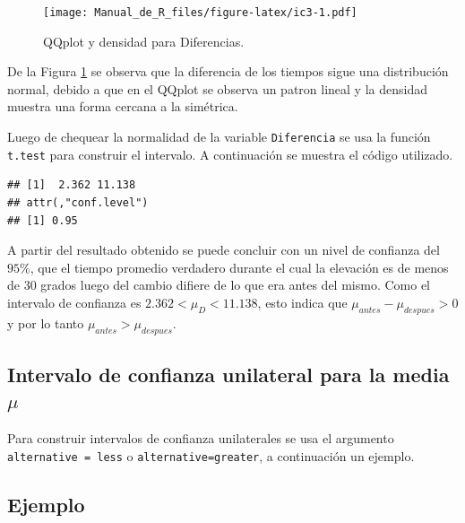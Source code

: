 \documentclass[10pt,]{krantz}
\makeatletter
\newenvironment{Shaded}{\begin{snugshade}}{\end{snugshade}}
\newcommand{\KeywordTok}[1]{\textcolor[rgb]{0.13,0.29,0.53}{\textbf{#1}}}
\newcommand{\DataTypeTok}[1]{\textcolor[rgb]{0.13,0.29,0.53}{#1}}
\newcommand{\FloatTok}[1]{\textcolor[rgb]{0.00,0.00,0.81}{#1}}
\newcommand{\OtherTok}[1]{\textcolor[rgb]{0.56,0.35,0.01}{#1}}
\newcommand{\OperatorTok}[1]{\textcolor[rgb]{0.81,0.36,0.00}{\textbf{#1}}}
\newcommand{\NormalTok}[1]{#1}
\newenvironment{kframe}{%
\medskip{}
\setlength{\fboxsep}{.8em}
 \def\at@end@of@kframe{}%
 \ifinner\ifhmode%
  \def\at@end@of@kframe{\end{minipage}}%
  \begin{minipage}{\columnwidth}%
 \fi\fi%
 \def\FrameCommand##1{\hskip\@totalleftmargin \hskip-\fboxsep
 \colorbox{shadecolor}{##1}\hskip-\fboxsep
     \hskip-\linewidth \hskip-\@totalleftmargin \hskip\columnwidth}%
 \MakeFramed {\advance\hsize-\width
   \@totalleftmargin\z@ \linewidth\hsize
   \@setminipage}}%
 {\par\unskip\endMakeFramed%
 \at@end@of@kframe}
\renewenvironment{Shaded}{\begin{kframe}}{\end{kframe}}
\makeatother
\begin{document}
\begin{figure}
\centering
\texttt{[image: Manual\_de\_R\_files/figure-latex/ic3-1.pdf]}
\caption{\label{fig:ic3}QQplot y densidad para Diferencias.}
\end{figure}

De la Figura \ref{fig:ic3} se observa que la diferencia de los tiempos
sigue una distribución normal, debido a que en el QQplot se observa un
patron lineal y la densidad muestra una forma cercana a la simétrica.

Luego de chequear la normalidad de la variable \texttt{Diferencia} se
usa la función \texttt{t.test} para construir el intervalo. A
continuación se muestra el código utilizado.

\begin{Shaded}
\end{Shaded}

\begin{verbatim}
## [1]  2.362 11.138
## attr(,"conf.level")
## [1] 0.95
\end{verbatim}

A partir del resultado obtenido se puede concluir con un nivel de
confianza del \(95\%\), que el tiempo promedio verdadero durante el cual
la elevación es de menos de 30 grados luego del cambio difiere de lo que
era antes del mismo. Como el intervalo de confianza es
\(2.362< \mu_D < 11.138\), esto indica que
\(\mu_{antes} - \mu_{despues}>0\) y por lo tanto
\(\mu_{antes} > \mu_{despues}\).

\subsection{\texorpdfstring{Intervalo de confianza unilateral para la
media
\(\mu\)}{Intervalo de confianza unilateral para la media \textbackslash{}mu}}\label{intervalo-de-confianza-unilateral-para-la-media-mu}

Para construir intervalos de confianza unilaterales se usa el argumento
\texttt{alternative\ =\ \textquotesingle{}less\textquotesingle{}} o
\texttt{alternative=\textquotesingle{}greater\textquotesingle{}}, a
continuación un ejemplo.

\subsection*{Ejemplo}\label{ejemplo-58}
\end{document}

